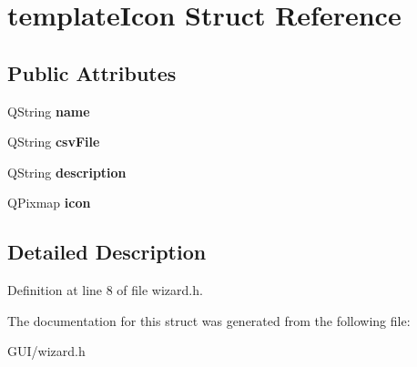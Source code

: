 \hypertarget{structtemplate_icon}{}\section{template\+Icon Struct Reference}
\label{structtemplate_icon}
\subsection*{Public Attributes}
\begin{DoxyCompactItemize}
\item 
\mbox{\label{structtemplate_icon_a47a2311b377e55070d0e1a8e38e01932}} 
Q\+String {\bfseries name}
\item 
\mbox{\label{structtemplate_icon_a8b2aa7e8d6b2a8e76a9e9b0d217ca720}} 
Q\+String {\bfseries csv\+File}
\item 
\mbox{\label{structtemplate_icon_a1e49eaea7a796f8c2a196a2870032aa1}} 
Q\+String {\bfseries description}
\item 
\mbox{\label{structtemplate_icon_aba40fb79c2e7fd9b9d6198432f4152d3}} 
Q\+Pixmap {\bfseries icon}
\end{DoxyCompactItemize}


\subsection{Detailed Description}


Definition at line 8 of file wizard.\+h.



The documentation for this struct was generated from the following file\+:\begin{DoxyCompactItemize}
\item 
G\+U\+I/wizard.\+h\end{DoxyCompactItemize}
